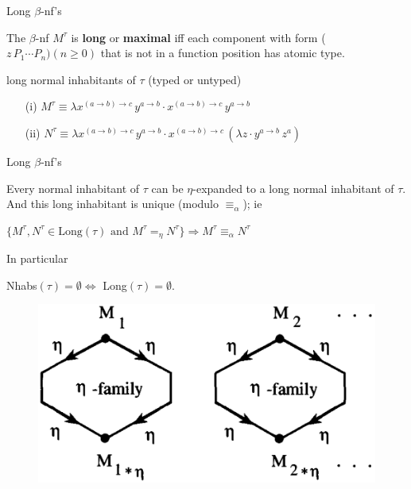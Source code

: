 \begin{frame}{Long $\beta$-nf's}

 \begin{mydef}
The $\beta$-nf $M^{\tau}$ is \textbf{long} or \textbf{maximal} 
iff each component with form ($z\, P_1 \cdots P_n)(n \geq 0)$ that is
not in a function position has atomic type.
\end{mydef}
\vspace*{0.3cm}

\begin{notation}
 long normal inhabitants of $\tau$ (typed or untyped)
\end{notation}
\vspace*{0.3cm}

\begin{exa}
\begin{itemize}
 \item[(i)] $M^{\tau} \equiv \lambda x^{(a\to b) \to c} \, y^{a \to b} \cdot x^{(a \to b) \to c} \, y^{a \to b}$ 
 \item[(ii)] $N^{\tau} \equiv \lambda x^{(a\to b) \to c} \, y^{a \to b} \cdot x^{(a \to b) \to c} \, (\lambda z \cdot y^{a \to b}\, z^a)$ \checkmark
\end{itemize}
\end{exa}

\end{frame}

\begin{frame}{Long $\beta$-nf's} 
 \begin{lem} \label{8A8} Every normal inhabitant of $\tau$ can be $\eta$-expanded to a long normal inhabitant of $\tau$.
And this long inhabitant is unique (modulo $\equiv_{\alpha}$); ie
\begin{center}
$\{M^{\tau}, N^{\tau} \in \mbox{Long}(\tau) \mbox{ and } M^{\tau} =_{\eta} N^{\tau}\} \Longrightarrow  M^{\tau} \equiv_{\alpha} N^{\tau}$ 
\end{center}
In particular
\begin{center}
 Nhabs$(\tau) = \emptyset \Longleftrightarrow$ Long$(\tau) = \emptyset$. 
\end{center}


\end{lem}

\begin{figure}[h]
   \centering
   \includegraphics[scale=0.3]{fig1.png}
\end{figure}
\end{frame}

